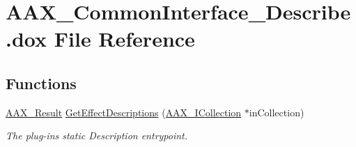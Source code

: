 \hypertarget{a00308}{}\section{A\+A\+X\+\_\+\+Common\+Interface\+\_\+\+Describe.\+dox File Reference}
\label{a00308}
\subsection*{Functions}
\begin{DoxyCompactItemize}
\item 
\mbox{\hyperlink{a00392_a4d8f69a697df7f70c3a8e9b8ee130d2f}{A\+A\+X\+\_\+\+Result}} \mbox{\hyperlink{a00796_gae0d356eef326f77cbb972e48946d4892}{Get\+Effect\+Descriptions}} (\mbox{\hyperlink{a01777}{A\+A\+X\+\_\+\+I\+Collection}} $\ast$in\+Collection)
\begin{DoxyCompactList}\small\item\em The plug-\/in\textquotesingle{}s static Description entrypoint. \end{DoxyCompactList}\end{DoxyCompactItemize}
